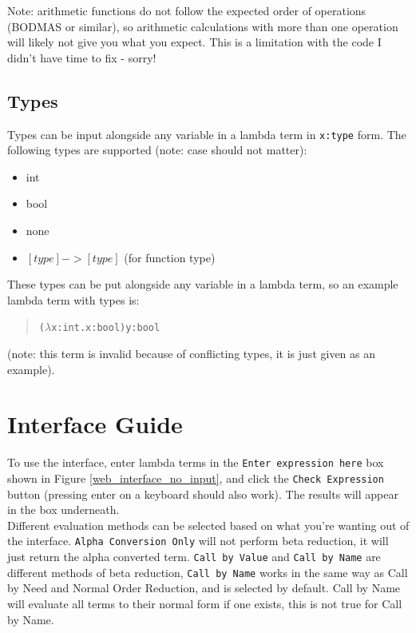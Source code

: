 \documentclass[a4paper,11pt]{article}
\begin{document}
Note: arithmetic functions do not follow the expected order of operations (BODMAS or similar), so arithmetic calculations with more than one operation will likely not give you what you expect. This is a limitation with the code I didn't have time to fix - sorry!

\subsection{Types}
Types can be input alongside any variable in a lambda term in \texttt{x:type} form. The following types are supported (note: case should not matter):

\begin{itemize}
	\item int
	\item bool
	\item none
	\item $[type] -> [type]$ (for function type)
\end{itemize}

These types can be put alongside any variable in a lambda term, so an example lambda term with types is:
\begin{quotation} \texttt{($\lambda$x:int.x:bool)y:bool} \end{quotation}
(note: this term is invalid because of conflicting types, it is just given as an example).

\section{Interface Guide}

To use the interface, enter lambda terms in the \texttt{Enter expression here} box shown in Figure \ref{web_interface_no_input}, and click the \texttt{Check Expression} button (pressing enter on a keyboard should also work). The results will appear in the box underneath.\\

Different evaluation methods can be selected based on what you're wanting out of the interface. \texttt{Alpha Conversion Only} will not perform beta reduction, it will just return the alpha converted term. \texttt{Call by Value} and \texttt{Call by Name} are different methods of beta reduction, \texttt{Call by Name} works in the same way as Call by Need and Normal Order Reduction, and is selected by default. Call by Name will evaluate all terms to their normal form if one exists, this is not true for Call by Name.\\
\end{document}
